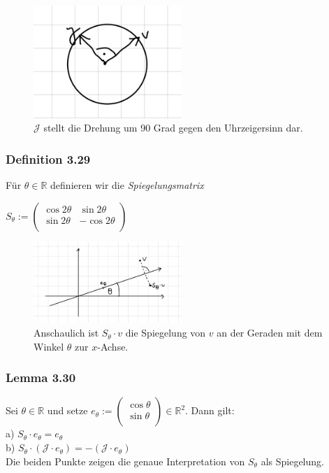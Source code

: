\documentclass{article}
\begin{document}
\begin{figure}[h]
    \centering
    \includegraphics[width=0.5\textwidth]{Images/3.40.jpeg}
    \caption{$\mathcal{J}$ stellt die Drehung um 90 Grad gegen den Uhrzeigersinn dar.}
\end{figure}

\subsubsection*{Definition 3.29}
Für $\theta \in \mathbb{R}$ definieren wir die \textit{Spiegelungsmatrix} \\
\begin{center}
    $S_\theta := \begin{pmatrix}
        \cos 2\theta & \sin 2\theta \\
        \sin 2\theta & -\cos 2\theta \\
    \end{pmatrix}$
\end{center}
\begin{figure}[h]
    \centering
    \includegraphics[width=0.5\textwidth]{Images/3.29.jpeg}
    \caption{Anschaulich ist $S_\theta \cdot v$ die Spiegelung von $v$ an der Geraden mit dem Winkel $\theta$ zur $x$-Achse.    }
\end{figure}

\subsubsection*{Lemma 3.30}
Sei $\theta \in \mathbb{R}$ und setze $e_\theta := \begin{pmatrix}
    \cos \theta \\
    \sin \theta \\
\end{pmatrix} \in \mathbb{R}^2$. Dann gilt: \\
a) $S_\theta \cdot e_\theta = e_\theta$ \\
b) $S_\theta \cdot (\mathcal{J} \cdot e_\theta) = -(\mathcal{J} \cdot e_\theta)$ \\
Die beiden Punkte zeigen die genaue Interpretation von $S_\theta$ als Spiegelung. \\
\\
\end{document}
